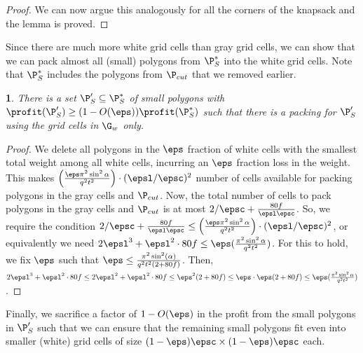 \documentclass[10pt,a4paper]{article}
\theoremstyle{plain}
\theoremstyle{plain}
\newtheorem{lem}[theorem]{\protect\lemmaname}
\theoremstyle{plain}
\theoremstyle{definition}
\providecommand{\lemmaname}{Lemma}
\begin{document}
{\begin{proof}
	We can now argue this analogously for all the corners of the knapsack and the lemma is proved. 
\end{proof}

Since there are much more white grid cells than gray grid cells, we can show that we can pack almost all (small) polygons from $\P^*_S$ into the white grid cells. Note that  $\P^*_S$ includes the polygons from $\P_{cut}$ that we removed earlier.

\begin{lem} \label{lem:small-circles-white-grid-cells}There
	is a set $\P'_S \subseteq \P^*_S$ of small polygons with
	$\profit(\P'_S)\ge (1-O(\eps)) \profit(\P^*_S)$
	such that there is a packing for $\P'_S$ using the grid cells in $\G_w$ only.
\end{lem}
\begin{proof}
	We delete all polygons in the 
$\eps$ fraction of white cells with the smallest total
	weight among all white cells, incurring an $\eps$ fraction loss in the weight. 
 This makes $\left ( \frac{\eps \pi^2 \sin^2 \alpha}{q^2 t^2} \right )\cdot (\epsl/\epsc)^2$
 number of cells available for packing polygons in the gray cells and $\P_{cut}$. 
	Now, the total number of cells to pack polygons in the gray cells and $\P_{cut}$ is at most 
$2/\epsc+ \frac{80f}{\epsl \epsc}$.
 So, we require the condition $2/\epsc+ \frac{80f}{\epsl \epsc} \le \left ( \frac{\eps \pi^2 \sin^2 \alpha}{q^2 t^2} \right )\cdot (\epsl/\epsc)^2$, or equivalently we need $2 \epsl^3+\epsl^2 \cdot 80f \le \eps (\frac{\pi^2 \sin^2 \alpha}{q^2 t^2})$. 
 For this to hold, we fix $\eps$ such that $\eps \le \frac{\pi^2 \sin^2(\alpha)}{q^2t^2(2+80f)}$.
 Then, $2 \epsl^3+\epsl^2 \cdot 80f \le 2 \epsl^2+\epsl^2 \cdot 80f \le \eps^2(2+80f) \le \eps \cdot \eps(2+80f) \le \eps (\frac{\pi^2 \sin^2 \alpha}{q^2 t^2})$.
\end{proof}

Finally, we sacrifice a factor of $1-O(\eps)$ in the profit from the small polygons in $\P'_S$ such that we can ensure that
the remaining small polygons fit even into smaller (white) grid cells of size $(1-\eps)\epsc \times(1-\eps)\epsc$ each.

}
\end{document}
